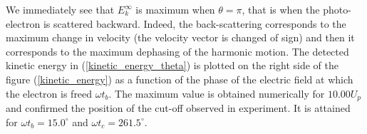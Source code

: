 \documentclass[a4paper]{article}
\begin{document}
We immediately see that $E_{k}^{\infty}$ is maximum when $\theta=\pi$, that is when the photo-electron is scattered backward. Indeed, the back-scattering corresponds to the maximum change in velocity (the velocity vector is changed of sign) and then it corresponds to the maximum dephasing of the harmonic motion. The detected kinetic energy in (\ref{kinetic_energy_theta}) is plotted on the right side of the figure (\ref{kinetic_energy}) as a function of the phase of the electric field at which the electron is freed $\omega t_{b}$.
The maximum value is obtained numerically for $10.00 U_{p}$ and confirmed the position of the cut-off observed in experiment. It is attained for $\omega t_{b}=15.0^{\circ}$ and $\omega t_{c}=261.5^{\circ}$.



\end{document}
